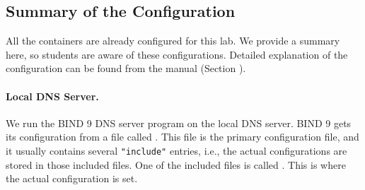 

\subsection{Summary of the Configuration} 

All the containers are already configured for this lab. 
We provide a summary here, so students are aware of 
these configurations. Detailed explanation
of the configuration can be found from the manual (Section \manualdns).



\paragraph{Local DNS Server.} 
We run the BIND 9 DNS server program on the local DNS server. 
BIND 9 gets its configuration from a file called . This file
is the primary configuration file, and it usually contains several \texttt{"include"}
entries, i.e., the actual configurations are stored in those included files. One of the
included files is called . 
This is where the actual configuration is set. 


